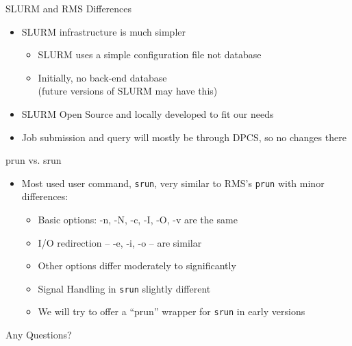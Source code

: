 \documentclass[%
letterpaper,
pdf,
slideColor,
alienglow
]{prosper}
\begin{document}
%
%
\begin{slide}{SLURM and RMS Differences}
\raggedright
\begin{itemize}
\item SLURM infrastructure is much simpler 
  \begin{itemize}
  \item SLURM uses a simple configuration file not database
  \item Initially, no back-end database \\ 
        (future versions of SLURM may have this)
  \end{itemize}
\item SLURM Open Source and locally developed to fit our needs
\item Job submission and query will mostly be through DPCS, so no changes
      there
\end{itemize}
\end{slide}

%
%
\begin{slide}{prun vs. srun}
\raggedright
\begin{itemize}
\item Most used user command, {\tt srun}, very similar to RMS's {\tt prun}
      with minor differences:
  \begin{itemize}
  \item Basic options: -n,  -N, -c, -I, -O, -v are the same
  \item I/O redirection --  -e, -i, -o -- are similar
  \item Other options differ moderately to significantly
  \item Signal Handling in {\tt srun} slightly different
  \item We will try to offer a ``prun'' wrapper for {\tt srun} in early versions
  \end{itemize}
\end{itemize}
\end{slide}

%
\begin{slide}{Any Questions?}
\hfill \hfill {} \hfill
\end{slide}
\end{document}
